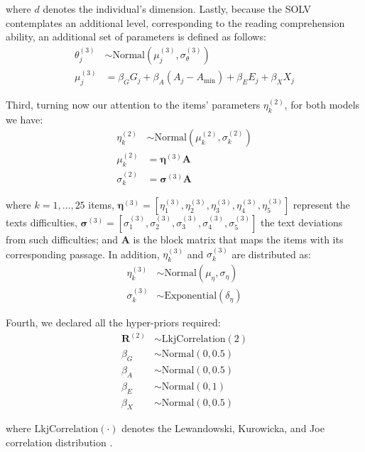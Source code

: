 where $d$ denotes the individual's dimension. Lastly, because the SOLV contemplates an additional level, corresponding to the reading comprehension ability, an additional set of parameters is defined as follows:
%
\begin{align}
	\theta^{(3)}_{j} &\sim \text{Normal} \left( \mu^{(3)}_{j}, \sigma^{(3)}_{\theta} \right) \\
	\mu^{(3)}_{j} &= \beta_{G} G_{j} + \beta_{A} (A_{j} - A_{\text{min}}) + \beta_{E} E_{j} + \beta_{X} X_{j}
\end{align}

Third, turning now our attention to the items' parameters $\eta^{(2)}_{k}$, for both models we have:
%
\begin{align}
	\eta^{(2)}_{k} &\sim \text{Normal} \left( \mu^{(2)}_{k}, \sigma^{(2)}_{k} \right) \\
	\mu^{(2)}_{k} &= \pmb{\eta}^{(3)} \mathbf{A} \\
	\sigma^{(2)}_{k} &= \pmb{\sigma}^{(3)} \mathbf{A}
\end{align}

where $k=1, \dots, 25$ items, $\pmb{\eta}^{(3)} = [ \eta^{(3)}_{1}, \eta^{(3)}_{2}, \eta^{(3)}_{3}, \eta^{(3)}_{4}, \eta^{(3)}_{5} ]$ represent the texts difficulties, $\pmb{\sigma}^{(3)} = [ \sigma^{(3)}_{1}, \sigma^{(3)}_{2}, \sigma^{(3)}_{3}, \sigma^{(3)}_{4}, \sigma^{(3)}_{5} ]$ the text deviations from such difficulties; and $\mathbf{A}$ is the block matrix that maps the items with its corresponding passage. In addition, $\eta^{(3)}_{k}$ and $\sigma^{(3)}_{k}$ are distributed as:
%
\begin{align}
	\eta^{(3)}_{k} &\sim \text{Normal} \left( \mu_{\eta}, \sigma_{\eta} \right) \\
	\sigma^{(3)}_{k} &\sim \text{Exponential} \left( \delta_{\eta} \right)
\end{align}

Fourth, we declared all the hyper-priors required:
%
\begin{align}
	\boldsymbol{R}^{(2)} &\sim \text{LkjCorrelation}( 2 ) \\
	\beta_{G} &\sim \text{Normal}( 0, 0.5 ) \\
	\beta_{A} &\sim \text{Normal}( 0, 0.5 ) \\
	\beta_{E} &\sim \text{Normal}( 0, 1 ) \\
	\beta_{X} &\sim \text{Normal}( 0, 0.5 ) 
\end{align}

\noindent where $\text{LkjCorrelation}(\cdot)$ denotes the Lewandowski, Kurowicka, and Joe correlation distribution \cite{Lewandowski_et_al_2009}. 

